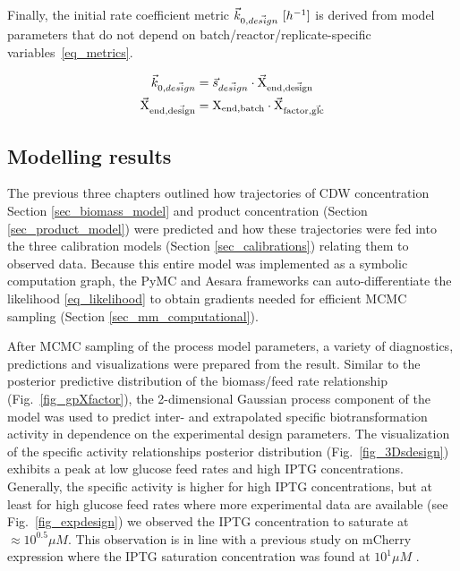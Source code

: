 \documentclass[sn-standardnature]{sn-jnl}%
\def\vec{\mathaccent "017E\relax }
\theoremstyle{thmstyleone}%
\theoremstyle{thmstyletwo}%
\theoremstyle{thmstylethree}%
\begin{document}
Finally, the initial rate coefficient metric $\vec{k}_{0,\vec{design}}\ [h^{-1}]$ is derived from model parameters that do not depend on batch/reactor/replicate-specific variables~\eqref{eq_metrics}.

\begin{equation}
\begin{aligned}
    \vec{k}_{0,\vec{design}} &= \vec{s}_{\vec{design}} \cdot \mathrm{\vec{X}_{end,\vec{design}}} \\
    \mathrm{\vec{X}_{end,\vec{design}}} &= \mathrm{X_{end,batch}} \cdot \mathrm{\vec{X}_{factor,\vec{glc}}}
\end{aligned}
\label{eq_metrics}
\end{equation}


\subsection{Modelling results}
The previous three chapters outlined how trajectories of CDW concentration Section \ref{sec_biomass_model} and product concentration (Section \ref{sec_product_model}) were predicted and how these trajectories were fed into the three calibration models (Section \ref{sec_calibrations}) relating them to observed data.
Because this entire model was implemented as a symbolic computation graph, the PyMC and Aesara frameworks can auto-differentiate the likelihood \eqref{eq_likelihood} to obtain gradients needed for efficient MCMC sampling (Section \ref{sec_mm_computational}).

After MCMC sampling of the process model parameters, a variety of diagnostics, predictions and visualizations were prepared from the result.
Similar to the posterior predictive distribution of the biomass/feed rate relationship (Fig.~\ref{fig_gpXfactor}), the 2-dimensional Gaussian process component of the model was used to predict inter- and extrapolated specific biotransformation activity in dependence on the experimental design parameters.
The visualization of the specific activity relationships posterior distribution (Fig.~\ref{fig_3Dsdesign}) exhibits a peak at low glucose feed rates and high IPTG concentrations.
Generally, the specific activity is higher for high IPTG concentrations, but at least for high glucose feed rates where more experimental data are available (see Fig.~\ref{fig_expdesign}) we observed the IPTG concentration to saturate at $\approx 10^{0.5} \mu M$.
This observation is in line with a previous study on mCherry expression where the IPTG saturation concentration was found at $10^1 \mu M$ \cite{von2021automated}.
\end{document}
